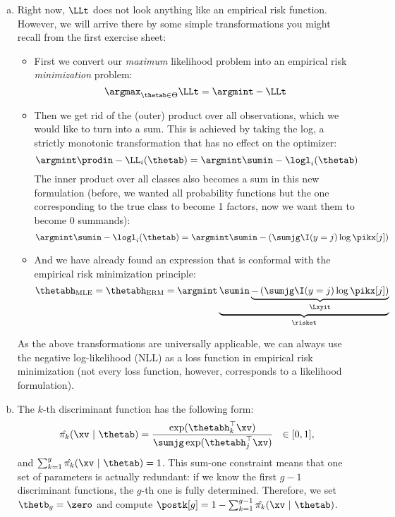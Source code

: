 \begin{enumerate}[a)]
  \item Right now, $\LLt$ does not look anything like an empirical risk 
  function.
  However, we will arrive there by some simple transformations you might 
  recall from the first exercise sheet:
  \begin{itemize}
    \item First we convert our \textit{maximum} likelihood problem into an 
    empirical risk \textit{minimization} problem:
    $$\argmax_{\thetab \in \Theta} \LLt = \argmint - \LLt$$
    \item Then we get rid of the (outer) product over all 
    observations, which we would like to turn into a sum.
    This is achieved by taking the log, a strictly monotonic 
    transformation that has no effect on the optimizer:
    $$\argmint \prodin - \LL_i(\thetab) = \argmint \sumin - \logl_i(\thetab)$$
    The inner product over all classes also becomes a sum in this new 
    formulation (before, we wanted all probability functions but the one 
    corresponding to the true class to become 1 factors, now we want them to 
    become 0 summands):
    $$\argmint \sumin - \logl_i(\thetab) = \argmint \sumin - \left( \sumjg 
    \I(y = j) \log \pikx[j] \right)$$
    \item And we have already found an expression that is conformal with the 
    empirical risk minimization principle:
    $$\thetabh_{\text{MLE}} = \thetabh_{\text{ERM}} = 
    \argmint \underbrace{\sumin \underbrace{- \left( \sumjg \I(y = j) \log 
    \pikx[j] \right)}_{\Lxyit}}_{\risket}$$
  \end{itemize}
  As the above transformations are universally applicable, we can always use 
  the negative log-likelihood (NLL) as a loss function in empirical risk 
  minimization (not every loss function, however, corresponds to a likelihood 
  formulation).
  
  \item The $k$-th discriminant function has the following form:
  $$ \hat{\pi_k}(\xv ~|~ \thetab) = \frac{\exp(\thetabh_k^\top \xv)}{\sumjg 
  \exp(\thetabh_j^\top \xv)} 
  ~~ \in [0, 1],$$
  and $\sum_{k = 1}^g \hat{\pi_k}(\xv ~|~ \thetab) = 1$.
  This sum-one constraint means that one set of parameters is actually 
  redundant: if we know the first $g - 1$ discriminant functions, the $g$-th one 
  is fully determined.
  Therefore, we set $\thetb_g = \zero$ and compute $\postk[g] = 
  1 - \sum_{k = 1}^{g - 1} \hat{\pi_k}(\xv ~|~ \thetab)$.
  

\end{enumerate}

